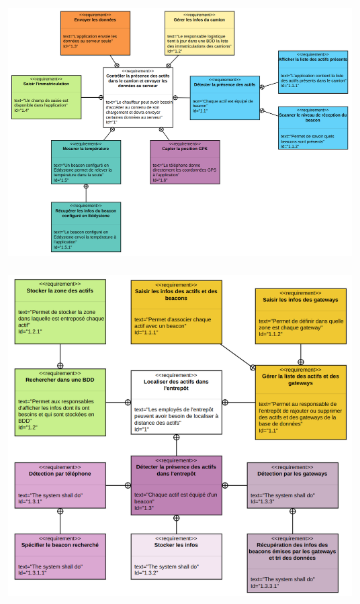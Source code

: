 \documentclass[10pt,a4paper]{book}
\begin{document}
\begin{figure}[h!]
    \centering
    \begin{subfigure}[b]{0.45\textwidth}
        \centering
        \includegraphics[scale=0.14]{Images/diagramme_exigences_camion.png}
        \caption{}
        \label{diagramme_exigences_camion} 
    \end{subfigure}
    \begin{subfigure}[b]{0.45\textwidth}
        \includegraphics[scale=0.14]{Images/diagramme_exigences_entrepot.png}
        \caption{}
        \label{diagramme_exigences_entrepot}
    \end{subfigure}
    \caption{}
\end{figure}
\end{document}
